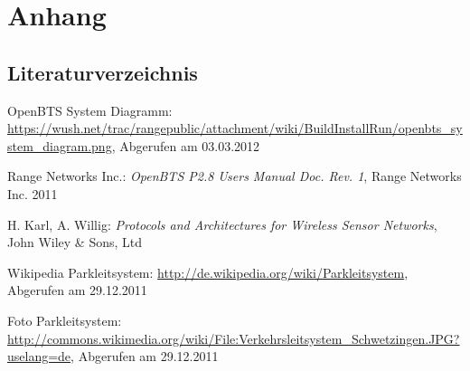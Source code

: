 \appendix
\section{Anhang}
\setcounter{section}{1}


\subsection{Literaturverzeichnis}
\renewcommand\refname{\vspace*{-2em}}

\begin{thebibliography}{}
 OpenBTS System Diagramm:
\url{https://wush.net/trac/rangepublic/attachment/wiki/BuildInstallRun/openbts_system_diagram.png},
Abgerufen am 03.03.2012

 Range Networks Inc.:
{\it OpenBTS P2.8 Users Manual Doc. Rev. 1},
Range Networks Inc. 2011

 H. Karl, A. Willig:
{\it Protocols and Architectures for Wireless Sensor Networks},
John Wiley \& Sons, Ltd

 Wikipedia Parkleitsystem:
\url{http://de.wikipedia.org/wiki/Parkleitsystem},
Abgerufen am 29.12.2011

 Foto Parkleitsystem:
\url{http://commons.wikimedia.org/wiki/File:Verkehrsleitsystem_Schwetzingen.JPG?uselang=de},
Abgerufen am 29.12.2011

\end{thebibliography}
\leereseite
